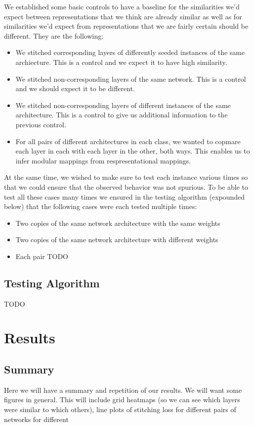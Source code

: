 \documentclass{article} %
\begin{document}
We established some basic controls to
have a baseline for the similarities we'd expect between representations that we think are already similar
as well as for similarities we'd expect from representations that we are fairly certain should be
different. They are the following:
\begin{itemize}
   \item We stitched corresponding layers of differently seeded instances of the same archiecture. This is a control and we expect it to have high similarity.
   \item We stitched non-corresponding layers of the same network. This is a control and we should expect it to be different.
   \item We stitched non-corresponding layers of different instances of the same architecture. This is a control to give us additional information to the previous control.
   \item For all pairs of different architectures in each class, we wanted to copmare each layer in each with each layer in the other, both ways. This enables us to infer modular mappings from respresentational mappings.
\end{itemize}

At the same time, we wished to make sure to test each instance various times so that we could ensure that the observed behavior was not spurious.
To be able to test all these cases many times we ensured in the testing algorithm (expounded below) that the following cases were
each tested multiple times:
\begin{itemize}
   \item Two copies of the same network architecture with the same weights
   \item Two copies of the same network architecture with different weights
   \item Each pair TODO
\end{itemize}

\subsection{Testing Algorithm}
TODO

\section{Results}
\subsection{Summary}
Here we will have a summary and repetition of our results. We will want some figures in general. This will
include grid heatmaps (so we can see which layers were similar to which others), line plots of stitching loss
for different pairs of networks for different 
\end{document}

